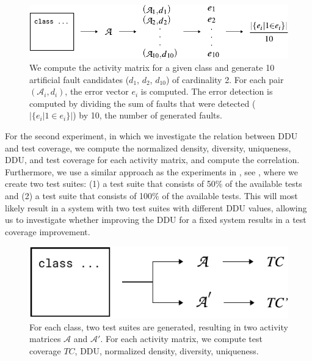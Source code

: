 \documentclass[twoside,a4paper,11pt]{memoir}
\begin{document}
\begin{figure}[b]
  \includegraphics[width=\linewidth]{figures/error_detection}
  \caption{We compute the activity matrix for a given class and generate 10 artificial fault candidates ($d_1$, $d_2$, $d_{10}$) of cardinality 2. For each pair $(\mathcal{A}_i, d_i)$, the error vector $e_i$ is computed. The error detection is computed by dividing the sum of faults that were detected ($|\{e_i | 1 \in e_i \}|$) by 10, the number of generated faults.}
  \label{fig:error_detection_computation}
\end{figure}

For the second experiment, in which we investigate the relation between DDU and test coverage, we compute the normalized density, diversity, uniqueness, DDU, and test coverage for each activity matrix, and compute the correlation.
Furthermore, we use a similar approach as the experiments in , see , where we create two test suites: (1) a test suite that consists of 50\% of the available tests and (2) a test suite that consists of 100\% of the available tests.
This will most likely result in a system with two test suites with different DDU values, allowing us to investigate whether improving the DDU for a fixed system results in a test coverage improvement.
\begin{figure}
  \center
  \includegraphics[width=0.6\linewidth]{figures/delta_test_coverage_approach}
  \caption{For each class, two test suites are generated, resulting in two activity matrices $\mathcal{A}$ and $\mathcal{A}'$. For each activity matrix, we compute test coverage $TC$, DDU, normalized density, diversity, uniqueness.}
  \label{fig:delta_test_coverage_approach}
\end{figure}
\end{document}
